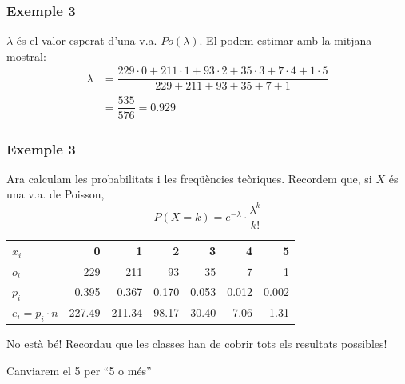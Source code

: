 \documentclass[12pt,t]{beamer}
\theoremstyle{plain}
\theoremstyle{definition}
\begin{document}
\begin{frame}
\frametitle{Exemple 3}
$\lambda$ és el valor esperat d'una v.a. $Po(\lambda)$. El podem estimar amb la mitjana mostral:
$$
\begin{array}{rl}
\lambda & =\dfrac{229\cdot 0+ 211\cdot 1+  93\cdot 2+ 35\cdot 3+7\cdot 4+ 1\cdot 5}{229+ 211+ 93 +35 + 7 + 1}\\[2ex]
 & =\dfrac{535}{576}=0.929
 \end{array}
$$

\end{frame}

\begin{frame}
\frametitle{Exemple 3}
Ara calculam les probabilitats i les freqüències teòriques. Recordem que, si $X$ és una v.a. de Poisson,
$$
P(X=k)=e^{-\lambda}\cdot \frac{\lambda^k}{k!}
$$
\begin{center}
\small \begin{tabular}{|l|rrrrrr|}
\hline
$x_i$ & 0 & 1 & 2 & 3 & 4 & 5 \\
\hline
$o_{i}$& 229 & 211 & 93 & 35 & 7 & 1 \\
\hline
$p_i$ &0.395 &  0.367  &0.170 & 0.053 & 0.012 & 0.002 \\ \hline
$e_i=p_i\cdot n$ &  227.49 & 211.34 & 98.17 & 30.40  & 7.06 &  1.31\\ \hline
\end{tabular}
\end{center}
\medskip

No està bé! Recordau que les classes han de cobrir tots els resultats possibles!
\medskip

Canviarem el 5 per ``5 o més''




\end{frame}
\end{document}
